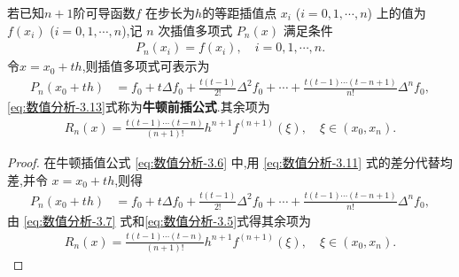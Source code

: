 \documentclass[../../main.tex]{subfiles}
\begin{document}
\begin{theorem}
若已知$n+1$阶可导函数$f$ 在步长为$h$的等距插值点 $x_i$ ($i = 0, 1, \cdots, n$) 上的值为 $f(x_i)$ ($i = 0, 1, \cdots, n$),记 $n$ 次插值多项式 $P_n(x)$ 满足条件
\begin{align*}
P_n(x_i) = f(x_i), \quad i = 0, 1, \cdots, n. 
\end{align*}
令$x=x_0+th$,则插值多项式可表示为
\begin{align}
P_n(x_0 + th) &= f_0 + t\Delta f_0 + \frac{t(t - 1)}{2!} \Delta^2 f_0 + \cdots + \frac{t(t - 1) \cdots (t - n + 1)}{n!} \Delta^n f_0, \label{eq:数值分析-3.13}
\end{align}
\eqref{eq:数值分析-3.13}式称为\textbf{牛顿前插公式}.其余项为
\begin{align}
R_n(x) = \frac{t(t - 1) \cdots (t - n)}{(n + 1)!} h^{n+1} f^{(n+1)}(\xi), \quad \xi \in (x_0, x_n). \label{eq:数值分析-3.14}
\end{align}
\end{theorem}
\begin{proof}
在牛顿插值公式 \eqref{eq:数值分析-3.6} 中,用 \eqref{eq:数值分析-3.11} 式的差分代替均差,并令 $x = x_0 + th$,则得
\begin{align*}
P_n(x_0 + th) &= f_0 + t\Delta f_0 + \frac{t(t - 1)}{2!} \Delta^2 f_0 + \cdots + \frac{t(t - 1) \cdots (t - n + 1)}{n!} \Delta^n f_0,
\end{align*}
由 \eqref{eq:数值分析-3.7} 式和\eqref{eq:数值分析-3.5}式得其余项为
\begin{align*}
R_n(x) = \frac{t(t - 1) \cdots (t - n)}{(n + 1)!} h^{n+1} f^{(n+1)}(\xi), \quad \xi \in (x_0, x_n). 
\end{align*}
\end{proof}
\end{document}
